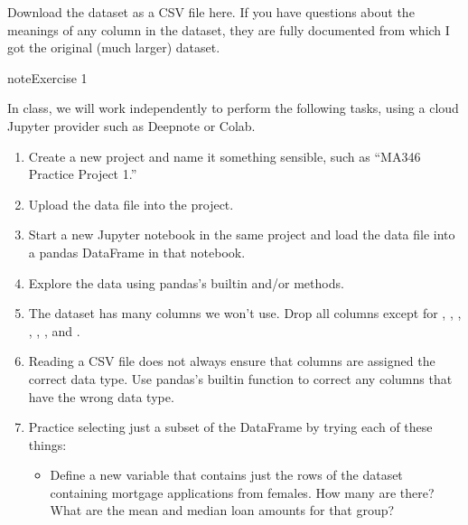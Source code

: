 \documentclass[letterpaper,10pt,english]{sphinxmanual}
\begin{document}
Download the dataset as a CSV file here.  If you have questions about the meanings of any column in the dataset, they are fully documented  from which I got the original (much larger) dataset.

\begin{sphinxadmonition}{note}{Exercise 1}

In class, we will work independently to perform the following tasks, using a cloud Jupyter provider such as Deepnote or Colab.
\begin{enumerate}
%
\item {} 
Create a new project and name it something sensible, such as “MA346 Practice Project 1.”

\item {} 
Upload the data file into the project.

\item {} 
Start a new Jupyter notebook in the same project and load the data file into a pandas DataFrame in that notebook.

\item {} 
Explore the data using pandas’s built\sphinxhyphen{}in  and/or  methods.

\item {} 
The dataset has many columns we won’t use.  Drop all columns except for , , , , , , and .

\item {} 
Reading a CSV file does not always ensure that columns are assigned the correct data type.  Use pandas’s built\sphinxhyphen{}in  function to correct any columns that have the wrong data type.

\item {} 
Practice selecting just a subset of the DataFrame by trying each of these things:
\begin{itemize}
\item {} 
Define a new variable  that contains just the rows of the dataset containing mortgage applications from females.  How many are there?  What are the mean and median loan amounts for that group?


\end{itemize}
\end{enumerate}
\end{sphinxadmonition}
\end{document}
